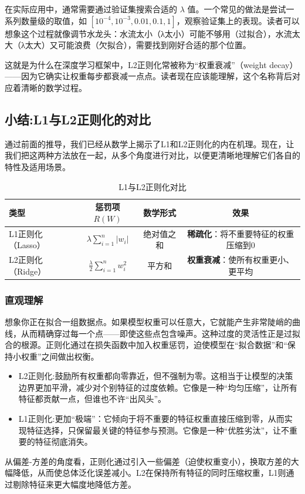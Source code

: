 \documentclass[lang=cn,zihao=-4,a4paper,fontset=windows]{beautybook}
\begin{document}
在实际应用中，通常需要通过验证集搜索合适的 \(\lambda\) 值。一个常见的做法是尝试一系列数量级的取值，如 \([10^{-4}, 10^{-3}, 0.01, 0.1, 1]\)，观察验证集上的表现。读者可以想象这个过程就像调节水龙头：水流太小（λ太小）可能不够用（过拟合），水流太大（λ太大）又可能浪费（欠拟合），需要找到刚好合适的那个位置。

这就是为什么在深度学习框架中，L2正则化常被称为“权重衰减”（weight decay）——因为它确实让权重每步都衰减一点点。读者现在应该能理解，这个名称背后对应着清晰的数学过程。

\subsection{小结:L1与L2正则化的对比}

通过前面的推导，我们已经从数学上揭示了L1和L2正则化的内在机理。现在，让我们把这两种方法放在一起，从多个角度进行对比，以便更清晰地理解它们各自的特性及适用场景。

\begin{table}[h]
\centering
\caption{L1与L2正则化对比}
\begin{tabular}{lccc}
\toprule
\textbf{类型} & \textbf{惩罚项 $R(W)$} & \textbf{数学形式} & \textbf{效果} \\
\midrule
L1正则化（Lasso） & \(\lambda \sum_{i=1}^n |w_i|\) & 绝对值之和 & \textbf{稀疏化}：将不重要特征的权重压缩到0 \\
L2正则化（Ridge） & \(\frac{\lambda}{2} \sum_{i=1}^n w_i^2\) & 平方和 & \textbf{权重衰减}：使所有权重更小、更平均 \\
\bottomrule
\end{tabular}
\end{table}

\subsubsection*{直观理解}

想象你正在拟合一组数据点。如果模型权重可以任意大，它就能产生非常陡峭的曲线，从而精确穿过每一个点——即使这些点包含噪声。这种过度的灵活性正是过拟合的根源。正则化通过在损失函数中加入权重惩罚，迫使模型在“拟合数据”和“保持小权重”之间做出权衡。
\begin{itemize}
\item L2正则化:鼓励所有权重都向零靠近，但不强制为零。这相当于让模型的决策边界更加平滑，减少对个别特征的过度依赖。它像是一种“均匀压缩”，让所有特征都贡献一点，但谁也不许“出风头”。
\item L1正则化:更加“极端”：它倾向于将不重要的特征权重直接压缩到零，从而实现特征选择，只保留最关键的特征参与预测。它像是一种“优胜劣汰”，让不重要的特征彻底消失。
\end{itemize}
从偏差-方差的角度看，正则化通过引入一些偏差（迫使权重变小），换取方差的大幅降低，从而使总体泛化误差减小。L2在保持所有特征的同时压缩权重，L1则通过剔除特征来更大幅度地降低方差。
\end{document}
